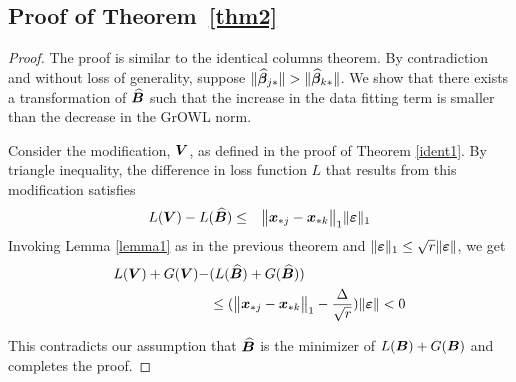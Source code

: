 \subsection*{Proof of Theorem~\ref{thm2}}
\begin{proof}
The proof is similar to the identical columns theorem. By contradiction and without loss of generality, suppose $\|\widehat {\boldsymbol{\beta}}_{j {\ast}}\| > \|\widehat {\boldsymbol{\beta}}_{k {\ast}}\|$. We show that there exists a transformation of $\widehat{\boldsymbol{B}}$ such that the increase in the data fitting term is smaller than the decrease in the GrOWL norm. 

Consider the modification, $\boldsymbol{V}$, as defined in the proof of Theorem \ref{ident1}. By triangle inequality, the difference in loss function $L$ that results from this modification satisfies
\begin{eqnarray*}
L(\bm V) - L(\widehat{\bm B})  & \leq  & \bigl\|{\bm x}_{{\ast} j}- {\bm x}_{{\ast} k}\bigr\|_1  \|\boldsymbol{\varepsilon} \|_1  
\end{eqnarray*}
Invoking Lemma \ref{lemma1} as in the previous theorem and $\| \boldsymbol{\varepsilon} \|_1 \leq \sqrt{r} \| \boldsymbol{\varepsilon} \|$, we get
\begin{align*}
L(\boldsymbol{V}) + G(\boldsymbol{V}) - &( L(\widehat{\boldsymbol{B}}) + G(\widehat{\boldsymbol{B}}) ) \\
&\leq (\bigl\|{\bm x}_{{\ast} j}- {\bm x}_{{\ast} k}\bigr\|_1 -  \frac{\Delta}{\sqrt{r}}) \|\boldsymbol{\varepsilon}\| <  0
\end{align*}

This contradicts our assumption that $\widehat{\boldsymbol{B}}$ is the minimizer of $L(\boldsymbol{B}) + G(\boldsymbol{B})$ and completes the proof.
\end{proof}

